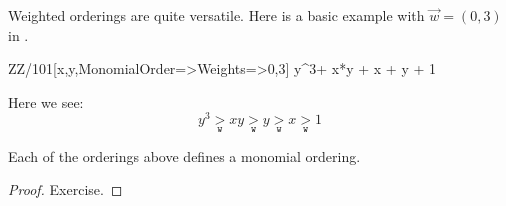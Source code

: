 \documentclass{ximera}
\begin{document}
Weighted orderings are quite versatile. Here is a basic example with
$\vec{w} = (0,3)$ in \macaulay.

\begin{macaulay2}
ZZ/101[x,y,MonomialOrder=>{Weights=>{0,3}}]
y^3+ x*y + x + y + 1
\end{macaulay2}

Here we see:
\[
y^3 \underset{\mathtt{w}}{>} xy \underset{\mathtt{w}}{>} y \underset{\mathtt{w}}{>} x \underset{\mathtt{w}}{>} 1
\]

\begin{proposition}
  Each of the orderings above defines a monomial ordering.
  \begin{proof}
    Exercise.
  \end{proof}
\end{proposition}
\end{document}
